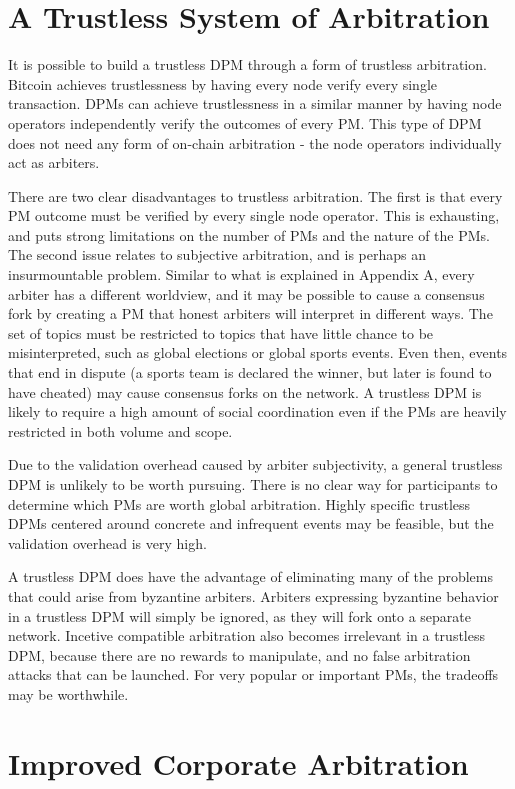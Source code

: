 \documentclass[onecolumn]{article}
\begin{document}
\section{A Trustless System of Arbitration}
It is possible to build a trustless DPM through a form of trustless arbitration.
Bitcoin achieves trustlessness by having every node verify every single transaction.
DPMs can achieve trustlessness in a similar manner by having node operators independently verify the outcomes of every PM.
This type of DPM does not need any form of on-chain arbitration - the node operators individually act as arbiters.

There are two clear disadvantages to trustless arbitration.
The first is that every PM outcome must be verified by every single node operator.
This is exhausting, and puts strong limitations on the number of PMs and the nature of the PMs.
The second issue relates to subjective arbitration, and is perhaps an insurmountable problem.
Similar to what is explained in Appendix A, every arbiter has a different worldview, and it may be possible to cause a consensus fork by creating a PM that honest arbiters will interpret in different ways.
The set of topics must be restricted to topics that have little chance to be misinterpreted, such as global elections or global sports events.
Even then, events that end in dispute (a sports team is declared the winner, but later is found to have cheated) may cause consensus forks on the network.
A trustless DPM is likely to require a high amount of social coordination even if the PMs are heavily restricted in both volume and scope.

Due to the validation overhead caused by arbiter subjectivity, a general trustless DPM is unlikely to be worth pursuing.
There is no clear way for participants to determine which PMs are worth global arbitration.
Highly specific trustless DPMs centered around concrete and infrequent events may be feasible, but the validation overhead is very high.

A trustless DPM does have the advantage of eliminating many of the problems that could arise from byzantine arbiters.
Arbiters expressing byzantine behavior in a trustless DPM will simply be ignored, as they will fork onto a separate network.
Incetive compatible arbitration also becomes irrelevant in a trustless DPM, because there are no rewards to manipulate, and no false arbitration attacks that can be launched.
For very popular or important PMs, the tradeoffs may be worthwhile.

\section{Improved Corporate Arbitration}
\end{document}
